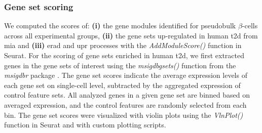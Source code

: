 \subsubsection{\large Gene set scoring}
\label{subsubsec:met_chp3_scoring}
We computed the scores of: \textbf{(i)} the gene modules identified for pseudobulk $\beta$-cells across all experimental groups, \textbf{(ii)} the gene sets up-regulated in human \gls{t2d} from \gls{mia} and \textbf{(iii)} \gls{erad} and \gls{upr} processes with the \textit{AddModuleScore()} function in Seurat. For the scoring of gene sets enriched in human \gls{t2d}, we first extracted genes in the gene sets of interest using the \textit{msigdb\textunderscore gsets()} function from the \textit{msigdbr} package \textbf{\cite{igor_dolgalev_msigdbr_2022}}. The gene set scores indicate the average expression levels of each gene set on single-cell level, subtracted by the aggregated expression of control feature sets. All analyzed genes in a given gene set are binned based on averaged expression, and the control features are randomly selected from each bin. The gene set scores were visualized with violin plots using the \textit{VlnPlot()} function in Seurat and with custom plotting scripts.

\clearpage

